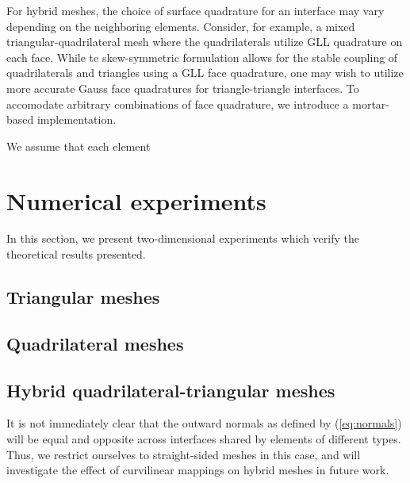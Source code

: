 \documentclass[review]{siamart0216}
\theoremstyle{assumption}
\newcommand{\note}[1]{{\color{blue}{#1}}}
\begin{document}
For hybrid meshes, the choice of surface quadrature for an interface may vary depending on the neighboring elements.  Consider, for example, a mixed triangular-quadrilateral mesh where the quadrilaterals utilize GLL quadrature on each face.  While te skew-symmetric formulation allows for the stable coupling of quadrilaterals and triangles using a GLL face quadrature, one may wish to utilize more accurate Gauss face quadratures for triangle-triangle interfaces.  To accomodate arbitrary combinations of face quadrature, we introduce a mortar-based implementation.  

We assume that each element 

\note{Finish - figure out notation for face interp!}

\section{Numerical experiments}
\label{sec:num}

In this section, we present two-dimensional experiments which verify the theoretical results presented.  %

\subsection{Triangular meshes}

\note{Affine and curved triangles with GLL surface quadrature (under-integrated).}

\subsection{Quadrilateral meshes}

\note{ GLL quadrilaterals with Gauss surface quadrature.  Explain that for GLL quadratures, the decoupled SBP property doesn't hold when Gauss points are used.  }

\subsection{Hybrid quadrilateral-triangular meshes}

It is not immediately clear that the outward normals as defined by (\ref{eq:normals}) will be equal and opposite across interfaces shared by elements of different types.  Thus, we restrict ourselves to straight-sided meshes in this case, and will investigate the effect of curvilinear mappings on hybrid meshes in future work.  
\end{document}
